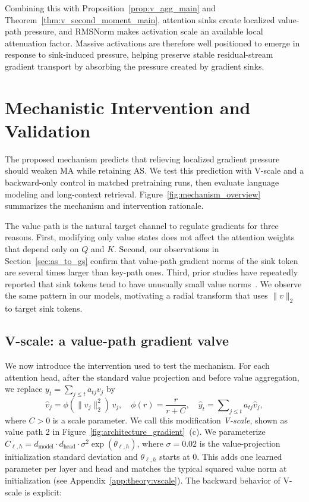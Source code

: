 \documentclass{article}
\theoremstyle{plain}
\theoremstyle{definition}
\theoremstyle{remark}
\begin{document}
Combining this with Proposition~\ref{prop:v_agg_main} and Theorem~\ref{thm:v_second_moment_main}, attention sinks create localized value-path pressure, and RMSNorm makes activation scale an available local attenuation factor. Massive activations are therefore well positioned to emerge in response to sink-induced pressure, helping preserve stable residual-stream gradient transport by absorbing the pressure created by gradient sinks.

\section{Mechanistic Intervention and Validation}
\label{sec:vscale}



The proposed mechanism predicts that relieving localized gradient pressure should weaken MA while retaining AS. We test this prediction with V-scale and a backward-only control in matched pretraining runs, then evaluate language modeling and long-context retrieval. Figure~\ref{fig:mechanism_overview} summarizes the mechanism and intervention rationale.

The value path is the natural target channel to regulate gradients for three reasons.
First, modifying only value states does not affect the attention weights that depend only on $Q$ and $K$.
Second, our observations in Section~\ref{sec:as_to_gs} confirm that value-path gradient norms of the sink token are several times larger than key-path ones. 
Third, prior studies have repeatedly reported that sink tokens tend to have unusually small value norms~\cite{guo2025activedormant,su2025kvsink,bu2025valuestategated}.
We observe the same pattern in our models, motivating a radial transform that uses $\|v\|_2$ to target sink tokens.



\subsection{V-scale: a value-path gradient valve}

We now introduce the intervention used to test the mechanism.
For each attention head, after the standard value projection and before value aggregation, we replace $y_t = \sum\nolimits_{j\le t} a_{tj} v_j$ by
\[
\hat v_j = \phi(\|v_j\|_2^2)\, v_j,
\quad
\phi(r)=\frac{r}{r+C}, \quad
\hat y_t = \sum\nolimits_{j\le t} a_{tj} \hat v_j,
\]
where $C>0$ is a scale parameter. We call this modification \emph{V-scale}, shown as value path 2 in Figure~\ref{fig:architecture_gradient}~(c).
We parameterize $C_{\ell,h}=d_{\mathrm{model}}\cdot d_{\mathrm{head}}\cdot\sigma^2\exp(\theta_{\ell,h})$, where $\sigma=0.02$ is the value-projection initialization standard deviation and $\theta_{\ell,h}$ starts at $0$. This adds one learned parameter per layer and head and matches the typical squared value norm at initialization (see Appendix~\ref{app:theory:vscale}). The backward behavior of V-scale is explicit:
\end{document}
